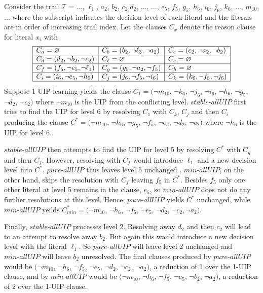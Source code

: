 \documentclass[runningheads]{llncs}
\newcommand{\assertionTrail}{\trail}
\newcommand{\allUip}{\textit{stable-allUIP}}
\newcommand{\allUipPure}{\textit{pure-allUIP}\xspace}
\newcommand{\allUipMin}{\textit{min-allUIP}\xspace}
\newcommand{\trail}{\ensuremath{\mathcal{T}}}
\newcommand{\whitebox}{\raisebox{.5ex}{\fbox{\hspace*{.2ex}}}}
\begin{document}
\begin{example}
    Consider the trail $\assertionTrail = \ldots$, $\ell_1$, $a_2$, $b_2$,
    $c_2$,$d_2$, $\ldots$, $\ldots$, $e_5$, $f_5$, $g_5$,
    $h_6$, $i_6$, $j_6$, $k_6$, $\ldots$, $m_{10}$,
    $\ldots$ where the subscript indicates the decision level of each
    literal and the literals are in order of increasing trail
    index. Let the clauses
    $C_x$ denote the reason clause for literal $x_i$ with 
    \[\begin{array}{|l|l|l|}\hline
      C_{a} = \varnothing 
      & C_{b} =  (b_2, \lnot \ell_3, \lnot a_2)
      & C_{c} =  (c_2, \lnot a_2, \lnot b_2) \\\hline
      C_{d} =  (d_2, \lnot b_2, \lnot c_2) 
      & C_{\ell} =\varnothing
      & C_{e} =\varnothing \\\hline
      C_{f} =  (f_5, \lnot e_5,\lnot \ell_1)
      & C_{g} = (g_5, \lnot a_2, \lnot f_5)
      & C_{h} =\varnothing \\\hline
      C_{i} =  (i_6, \lnot e_5, \lnot h_6)
      & C_{j} = (j_6, \lnot f_5, \lnot i_6 )
      & C_{k} = (k_6, \lnot f_5, \lnot j_6) \\\hline
      \end{array}
  \]
  Suppose 1-UIP learning yields the clause
  $C_1 = (\neg{m_{10}}$, $\neg{k_6}$, $\neg{j_6}$, $\neg{i_6}$,
  $\neg{h_6}$, $\neg{g_5}$, $\neg{d_2}$, $\neg{c_2})$ where $\neg{m_{10}}$
  is the UIP from the conflicting level. $\allUip$ first tries to find
  the UIP for level 6 by resolving $C_1$ with $C_k$, $C_j$
  and then $C_i$ producing the clause
  $C^* = (\neg{m_{10}}$, $\neg{h_6}$, $\neg{g_5}$,
  $\neg{f_5}$, $\neg{e_5}$, $\neg{d_2}$, $\neg{c_2})$ where
  $\neg{h_6}$ is the UIP for level 6.

  $\allUip$ then attempts to find the UIP for level 5 by resolving $C^*$
  with $C_g$ and then $C_f$. However, resolving with $C_f$ would
  introduce $\ell_1$ and a new decision level into $C^*$. $\allUipPure$
  thus leaves level 5 unchanged . $\allUipMin$, on the other hand, skips
  the resolution with $C_f$  leaving $f_5$ in $C^*$. Besides $f_5$
  only one other literal at level 5 remains in the clause, $e_5$,
  so $\allUipMin$ does not do any further resolutions at this level. Hence,
  $\allUipPure$ yields $C^*$ unchanged, while $\allUipMin$ yeilds
  $C^*_{\mathit{min}} = (\neg{m_{10}}$, $\neg{h_6}$, $\neg{f_5}$,
  $\neg{e_5}$, $\neg{d_2}$, $\neg{c_2}, \lnot a_2)$.

  Finally, $\allUip$ processes level 2. Resolving away $d_2$ and then
  $c_2$ will lead to an attempt to resolve away $b_2$. But again this
  would introduce a new decision level with the literal $\ell_1$. So
  $\allUipPure$ will leave level 2 unchanged and $\allUipMin$ will leave
  $b_2$ unresolved. The final clauses produced by $\allUipPure$ would be
  $(\neg{m_{10}}$, $\neg{h_6}$, $\neg{f_5}$, $\neg{e_5}$, $\neg{d_2}$,
  $\neg{c_2}$, $\neg{a_2})$, a reduction of 1 over the 1-UIP clause,
  and by $\allUipMin$ would be $(\neg{m_{10}}$, $\neg{h_6}$,
  $\neg{f_5}$, $\neg{e_5}$, $\neg{b_2}$, $\neg{a_2})$, a reduction of
  2 over the 1-UIP clause.
\whitebox
\end{example}
\end{document}
